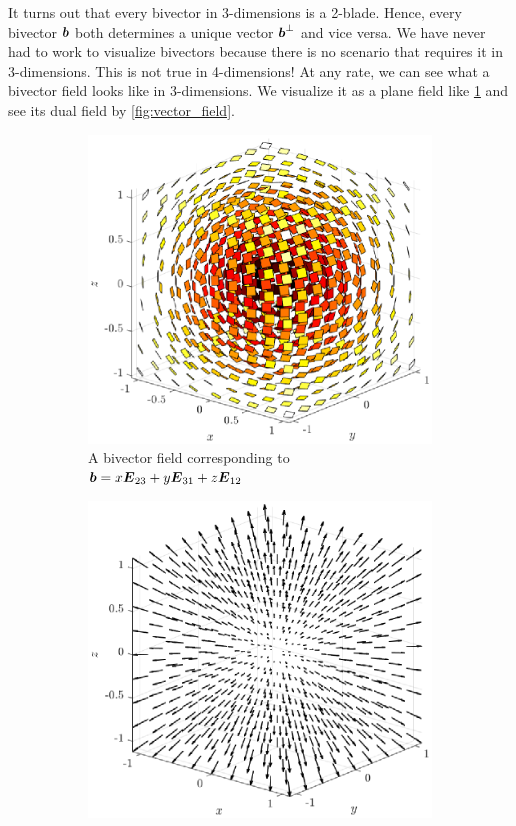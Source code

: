 \documentclass{article}
\begin{document}
It turns out that every bivector in 3-dimensions is a 2-blade. Hence, every bivector $\boldsymbol{b}$ both determines a unique vector $\boldsymbol{b}^\perp$ and vice versa. We have never had to work to visualize bivectors because there is no scenario that requires it in 3-dimensions. This is not true in 4-dimensions! At any rate, we can see what a bivector field looks like in 3-dimensions. We visualize it as a plane field like \cref{fig:plane_field} and see its dual field by \cref{fig:vector_field}. 
\begin{figure}[H]
\centering
\begin{subfigure}[b]{0.49\textwidth}
    \centering
    \includegraphics[width=\textwidth]{figures/plane_field}
    \caption{A bivector field corresponding to $\boldsymbol{b}=x \boldsymbol{E}_{23} + y\boldsymbol{E}_{31} + z\boldsymbol{E}_{12}$}
    \label{fig:plane_field}
\end{subfigure}
\begin{subfigure}[b]{0.49\textwidth}
    \centering
    \includegraphics[width=\textwidth]{figures/vector_field}

\end{subfigure}
\end{figure}
\end{document}
